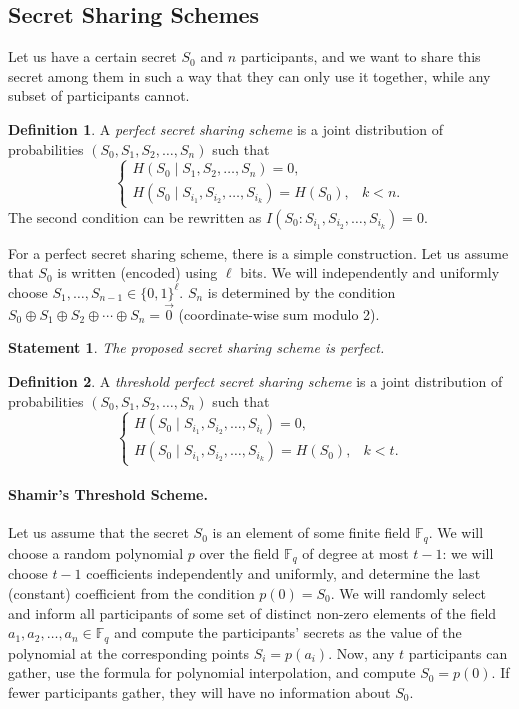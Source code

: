 \documentclass[12pt,sans]{article}
\newcommand{\seqn}[2]{{#1}_1,{#1}_2,\dotsc,{#1}_{#2}}
\newcommand{\seqin}[3]{{#1}_{{#2}_1},{#1}_{{#2}_2},\dotsc,{#1}_{{#2}_{#3}}}
\theoremstyle{definition}
\newtheorem{definition}{Definition}[section]
\theoremstyle{plain}
\newtheorem{statement}{Statement}[section]
\theoremstyle{remark}
\begin{document}
\subsection{Secret Sharing Schemes}

Let us have a certain secret $S_0$ and $n$ participants, and we want to share this secret among them in such a way that they can only use it together, while any subset of participants cannot.

\begin{definition}
    A \emph{perfect secret sharing scheme} is a joint distribution of probabilities $(S_0, \seqn{S}{n})$ such that
    \[
    \begin{cases}
        H(S_0 \mid \seqn{S}{n}) = 0,\\
        H(S_0 \mid \seqin{S}{i}{k}) = H(S_0), & k < n.
    \end{cases}
    \]
    The second condition can be rewritten as $I(S_0 : \seqin{S}{i}{k}) = 0$.
\end{definition}

For a perfect secret sharing scheme, there is a simple construction. Let us assume that $S_0$ is written (encoded) using $\ell$ bits. We will independently and uniformly choose $S_1, \dotsc, S_{n-1} \in \{0,1\}^\ell$. $S_n$ is determined by the condition
$S_0 \oplus S_1 \oplus S_2 \oplus \dotsb \oplus S_n = \vec 0$ (coordinate-wise sum modulo 2).

\begin{statement}
    The proposed secret sharing scheme is perfect.
\end{statement}

\begin{definition}
    A \emph{threshold perfect secret sharing scheme} is a joint distribution of probabilities $(S_0, \seqn{S}{n})$ such that
    \[
    \begin{cases}
        H(S_0 \mid \seqin{S}{i}{t}) = 0,\\
        H(S_0 \mid \seqin{S}{i}{k}) = H(S_0), & k < t.
    \end{cases}
    \]
\end{definition}

\paragraph{Shamir's Threshold Scheme.} Let us assume that the secret $S_0$ is an element of some finite field $\mathbb{F}_q$. We will choose a random polynomial $p$ over the field $\mathbb{F}_q$ of degree at most $t-1$: we will choose $t-1$ coefficients independently and uniformly, and determine the last (constant) coefficient from the condition $p(0) = S_0$. We will randomly select and inform all participants of some set of distinct non-zero elements of the field $\seqn{a}{n} \in \mathbb{F}_q$ and compute the participants' secrets as the value of the polynomial at the corresponding points $S_i = p(a_i)$. Now, any $t$ participants can gather, use the formula for polynomial interpolation, and compute $S_0 = p(0)$. If fewer participants gather, they will have no information about $S_0$.
\end{document}
